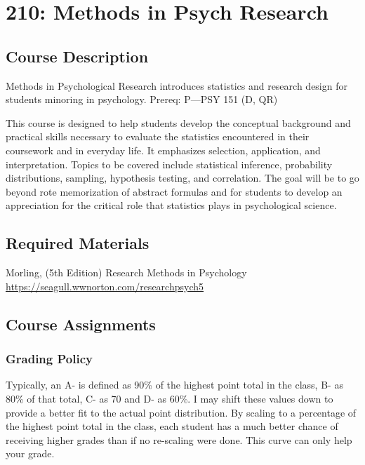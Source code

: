 \documentclass[
]{book}
\begin{document}
\chapter*{210: Methods in Psych Research}\label{statsminor}


\section*{Course Description}\label{course-description}


Methods in Psychological Research introduces statistics and research design for students minoring in psychology. Prereq: P---PSY 151 (D, QR)

This course is designed to help students develop the conceptual background and practical skills necessary to evaluate the statistics encountered in their coursework and in everyday life. It emphasizes selection, application, and interpretation. Topics to be covered include statistical inference, probability distributions, sampling, hypothesis testing, and correlation. The goal will be to go beyond rote memorization of abstract formulas and for students to develop an appreciation for the critical role that statistics plays in psychological science.

\section*{Required Materials}\label{required-materials}


Morling, (5th Edition) Research Methods in Psychology \url{https://seagull.wwnorton.com/researchpsych5}

\section*{Course Assignments}\label{course-assignments}


\subsection*{Grading Policy}\label{grading-policy}


Typically, an A- is defined as 90\% of the highest point total in the class, B- as 80\% of that total, C- as 70 and D- as 60\%.
I may shift these values down to provide a better fit to the actual point distribution.
By scaling to a percentage of the highest point total in the class, each student has a much better chance of receiving higher grades than if no re-scaling were done.
This curve can only help your grade.
\end{document}
